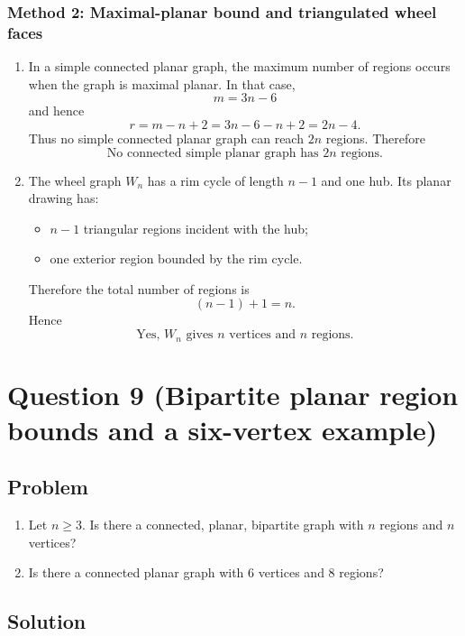 \documentclass[12pt]{article}
\begin{document}
\subsubsection{Method 2: Maximal-planar bound and triangulated wheel faces}
\begin{enumerate}[label=(\alph*)]
  \item In a simple connected planar graph, the maximum number of regions occurs when the graph is maximal planar. In that case,
  \[
    m=3n-6
  \]
  and hence
  \[
    r=m-n+2=3n-6-n+2=2n-4.
  \]
  Thus no simple connected planar graph can reach $2n$ regions. Therefore
  \[
    \boxed{\text{No connected simple planar graph has }2n\text{ regions}.}
  \]

  \item The wheel graph $W_n$ has a rim cycle of length $n-1$ and one hub. Its planar drawing has:
  \begin{itemize}[leftmargin=*]
    \item $n-1$ triangular regions incident with the hub;
    \item one exterior region bounded by the rim cycle.
  \end{itemize}
  Therefore the total number of regions is
  \[
    (n-1)+1=n.
  \]
  Hence
  \[
    \boxed{\text{Yes, }W_n\text{ gives }n\text{ vertices and }n\text{ regions}.}
  \]
\end{enumerate}

\newpage
\section{Question 9 (Bipartite planar region bounds and a six-vertex example)}

\subsection{Problem}
\begin{enumerate}[label=(\alph*)]
  \item Let $n\ge 3$. Is there a connected, planar, bipartite graph with $n$ regions and $n$ vertices?
  \item Is there a connected planar graph with $6$ vertices and $8$ regions?
\end{enumerate}

\subsection{Solution}
\end{document}
